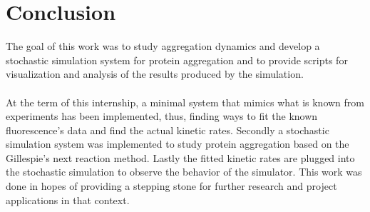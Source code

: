 \documentclass[11pt,a4paper]{article}
\begin{document}
\section{Conclusion}
The goal of this work was to study aggregation dynamics and develop a stochastic simulation system for protein aggregation and to provide scripts for visualization and analysis of the results produced by the simulation. \\
\\
At the term of this internship, a minimal system that mimics what is known from experiments has been implemented, thus, finding ways to fit the known fluorescence's data and find the actual kinetic rates. Secondly a stochastic simulation system was implemented to study protein aggregation based on the Gillespie's next reaction method. Lastly the fitted kinetic rates are plugged into the stochastic simulation to observe the behavior of the simulator.
This work was done in hopes of providing a stepping stone for further research and project applications in that context.
\clearpage


\end{document}
